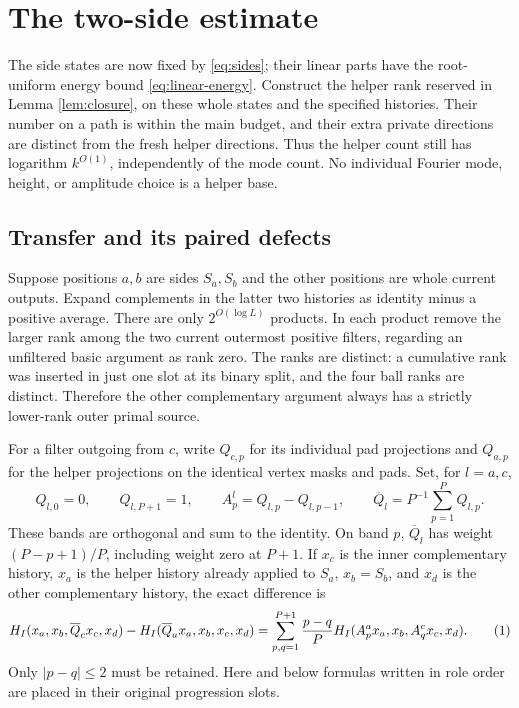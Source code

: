 \documentclass[11pt]{article}
\theoremstyle{definition}
\newcommand{\eqtag}[1]{\refstepcounter{equation}\tag{\theequation}\label{#1}}
\numberwithin{equation}{section}
\begin{document}
\section{The two-side estimate}\label{sec:sides}
The side states are now fixed by \eqref{eq:sides}; their linear parts have the root-uniform energy bound \eqref{eq:linear-energy}. Construct the helper rank reserved in Lemma \ref{lem:closure}, on these whole states and the specified histories. Their number on a path is within the main budget, and their extra private directions are distinct from the fresh helper directions. Thus the helper count still has logarithm $k^{O(1)}$, independently of the mode count. No individual Fourier mode, height, or amplitude choice is a helper base.

\subsection*{Transfer and its paired defects}
Suppose positions $a,b$ are sides $S_a,S_b$ and the other positions are whole current outputs. Expand complements in the latter two histories as identity minus a positive average. There are only $2^{O(\log L)}$ products. In each product remove the larger rank among the two current outermost positive filters, regarding an unfiltered basic argument as rank zero. The ranks are distinct: a cumulative rank was inserted in just one slot at its binary split, and the four ball ranks are distinct. Therefore the other complementary argument always has a strictly lower-rank outer primal source.

For a filter outgoing from $c$, write $Q_{c,p}$ for its individual pad projections and $Q_{a,p}$ for the helper projections on the identical vertex masks and pads. Set, for $l=a,c$,
\[
 Q_{l,0}=0,\qquad Q_{l,P+1}=1,\qquad A_p^l=Q_{l,p}-Q_{l,p-1},\qquad \overline Q_l=P^{-1}\sum_{p=1}^P Q_{l,p}.
\]
These bands are orthogonal and sum to the identity. On band $p$, $\overline Q_l$ has weight $(P-p+1)/P$, including weight zero at $P+1$. If $x_c$ is the inner complementary history, $x_a$ is the helper history already applied to $S_a$, $x_b=S_b$, and $x_d$ is the other complementary history, the exact difference is
\[
 H_I(x_a,x_b,\overline Q_c x_c,x_d)-H_I(\overline Q_a x_a,x_b,x_c,x_d)
 =\sum_{p,q=1}^{P+1}\frac{p-q}{P}H_I(A_p^a x_a,x_b,A_q^c x_c,x_d).
 \eqtag{eq:transfer}
\]
Only $|p-q|\le2$ must be retained. Here and below formulas written in role order are placed in their original progression slots.
\end{document}
